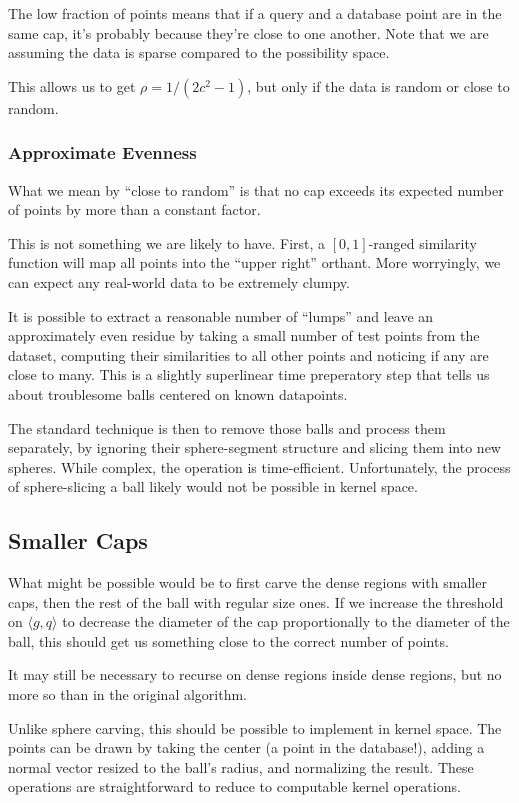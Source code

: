 \documentclass[twoside,11pt]{homework}
\begin{document}
The low fraction of points means that if a query and a database point
are in the same cap, it's probably because they're close to one
another.  Note that we are assuming the data is sparse compared to
the possibility space.

This allows us to get $\rho=1/(2c^2-1)$, but only if the data is
random or close to random.

\subsubsection{Approximate Evenness}

What we mean by ``close to random'' is that no cap exceeds its
expected number of points by more than a constant factor.

This is not something we are likely to have.  First, a $[0,1]$-ranged
similarity function will map all points into the ``upper right''
orthant.  More worryingly, we can expect any real-world data to be
extremely clumpy.

It is possible to extract a reasonable number of ``lumps'' and leave
an approximately even residue by taking a small number of test points
from the dataset, computing their similarities to all other points and
noticing if any are close to many.  This is a slightly superlinear
time preperatory step that tells us about troublesome balls centered
on known datapoints.

The standard technique is then to remove those balls and process them
separately, by ignoring their sphere-segment structure and slicing
them into new spheres.  While complex, the operation is
time-efficient.  Unfortunately, the process of sphere-slicing a ball
likely would not be possible in kernel space.

\subsection{Smaller Caps}

What might be possible would be to first carve the dense regions with
smaller caps, then the rest of the ball with regular size ones.  If we
increase the threshold on $\langle g,q \rangle$ to decrease the
diameter of the cap proportionally to the diameter of the ball, this
should get us something close to the correct number of points.  

It may still be necessary to recurse on dense regions inside dense
regions, but no more so than in the original algorithm.

Unlike sphere carving, this should be possible to implement in kernel
space.  The points can be drawn by taking the center (a point in the
database!), adding a normal vector resized to the ball's radius, and
normalizing the result.  These operations are straightforward to
reduce to computable kernel operations.
\end{document}
